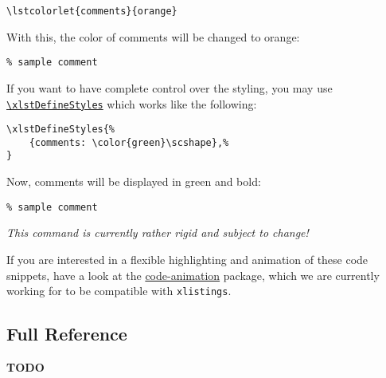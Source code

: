 \documentclass[10pt,DIV=12]{scrartcl}
\let\T\texttt
\def\cmdref#1{\hyperref[arg:#1]{\T{\xlstGetStyle{command}\textbackslash #1}}}
\begin{document}
\begin{verbatim}
\lstcolorlet{comments}{orange}
\end{verbatim}
\begingroup
{}

With this, the color of comments will be changed to orange:

\begin{verbatim}
% sample comment 
\end{verbatim}
\endgroup

If you want to have complete control over the styling, you may use \cmdref{xlstDefineStyles} which works like the following:

\begin{verbatim}
\xlstDefineStyles{%
    {comments: \color{green}\scshape},%
}
\end{verbatim}

\begingroup
{}

Now, comments will be displayed in green and bold:
\begin{verbatim}
% sample comment 
\end{verbatim}

\textit{This command is currently rather rigid and subject to change!}


If you are interested in a flexible highlighting and animation of these code snippets, have a look at the \href{https://github.com/EagleoutIce/code-animation}{code-animation} package, which we are currently working for to be compatible with \T{xlistings}.
\endgroup



\subsection{Full Reference}

\textbf{TODO}
\end{document}
